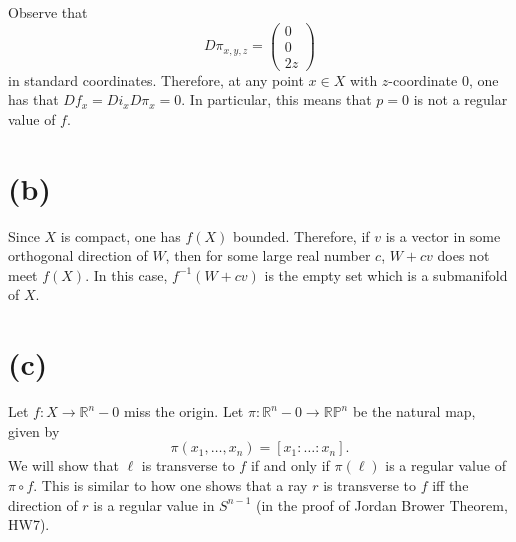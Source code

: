 \documentclass{amsbook}
\theoremstyle{theorem}
\theoremstyle{plain}
\theoremstyle{remark}
\newcommand{\R}{\mathbb R}
\renewcommand{\P}{\mathbb P}
\begin{document}
Observe that \[D\pi_{x,y,z} =
  \begin{pmatrix}
    0 \\ 0 \\ 2z
  \end{pmatrix}\] in standard coordinates. Therefore, at any point $x\in X$ with $z$-coordinate $0$, one has that $Df_x = Di_x D\pi_x = 0$. In particular, this means that $p = 0$ is not a regular value of $f$.
\section*{(b)}
Since $X$ is compact, one has $f(X)$ bounded. Therefore, if $v$ is a vector in some orthogonal direction of $W$, then for some large real number $c$, $W + cv$ does not meet $f(X)$. In this case, $f^{-1}(W+cv)$ is the empty set which is a submanifold of $X$.

\section*{(c)}
Let $f:X \to \R^n - 0$ miss the origin. Let $\pi: \R^n - 0 \to \R\P^n$ be the natural map, given by \[\pi(x_1, \dots, x_n) = [x_1:\dots:x_n].\] We will show that $\ell$ is transverse to $f$ if and only if $\pi (\ell)$ is a regular value of $\pi \circ f$. This is similar to how one shows that a ray $r$ is transverse to $f$ iff the direction of $r$ is a regular value in $S^{n-1}$ (in the proof of Jordan Brower Theorem, HW7).
\end{document}
